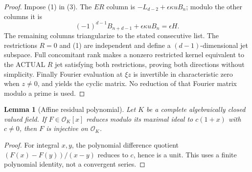\documentclass[11pt]{article}
\newtheorem{lemma}[theorem]{Lemma}
\begin{document}
\begin{proof}
Impose (1) in (3). The $ER$ column is
$-L_{d-2}+\epsilon\kappa u B_n$; modulo the other columns it is
\[
 (-1)^{d-1}B_{n+d-1}+\epsilon\kappa u B_n=\epsilon H.
\]
The remaining columns triangularize to the stated consecutive list.
The restrictions $R=0$ and (1) are independent and define a
$(d-1)$-dimensional jet subspace. Full concomitant rank makes a
nonzero restricted kernel equivalent to the ACTUAL $R$ jet satisfying
both restrictions, proving both directions without simplicity.
Finally Fourier evaluation at $\xi z$ is invertible in characteristic
zero when $z\ne0$, and yields the cyclic matrix.
No reduction of that Fourier matrix modulo a prime is used.
\end{proof}

\begin{lemma}[Affine residual polynomial]\label{lem:univalent}
Let $K$ be a complete algebraically closed valued field. If
$F\in\mathcal O_K[x]$ reduces modulo its maximal ideal to $c(1+x)$
with $c\ne0$, then $F$ is injective on $\mathcal O_K$.
\end{lemma}
\begin{proof}
For integral $x,y$, the polynomial difference quotient
$(F(x)-F(y))/(x-y)$ reduces to $c$, hence is a unit.
This uses a finite polynomial identity, not a convergent series.
\end{proof}
\end{document}
